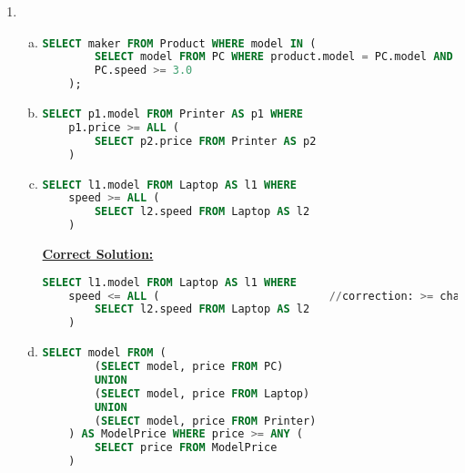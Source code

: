 \documentclass[12pt]{article}
\begin{document}
\begin{enumerate}[1.]
\begin{enumerate}[a)]
    \end{enumerate}

    \item

    \begin{enumerate}[a)]
        \item

    \begin{lstlisting}[language=SQL]
    SELECT maker FROM Product WHERE model IN (
        SELECT model FROM PC WHERE product.model = PC.model AND
        PC.speed >= 3.0
    );
    \end{lstlisting}


        \item

    \begin{lstlisting}[language=SQL]
    SELECT p1.model FROM Printer AS p1 WHERE
    p1.price >= ALL (
        SELECT p2.price FROM Printer AS p2
    )
    \end{lstlisting}

        \item

    \begin{lstlisting}[language=SQL]
    SELECT l1.model FROM Laptop AS l1 WHERE
    speed >= ALL (
        SELECT l2.speed FROM Laptop AS l2
    )
    \end{lstlisting}

        \begin{mdframed}

        \underline{\textbf{Correct Solution:}}

    \begin{lstlisting}[language=SQL]
    SELECT l1.model FROM Laptop AS l1 WHERE
    speed <= ALL (                          //correction: >= changed to <=
        SELECT l2.speed FROM Laptop AS l2
    )
    \end{lstlisting}

        \end{mdframed}

        \item

    \begin{lstlisting}[language=SQL]
    SELECT model FROM (
        (SELECT model, price FROM PC)
        UNION
        (SELECT model, price FROM Laptop)
        UNION
        (SELECT model, price FROM Printer)
    ) AS ModelPrice WHERE price >= ANY (
        SELECT price FROM ModelPrice
    )
    \end{lstlisting}



\end{enumerate}
\end{enumerate}
\end{document}
